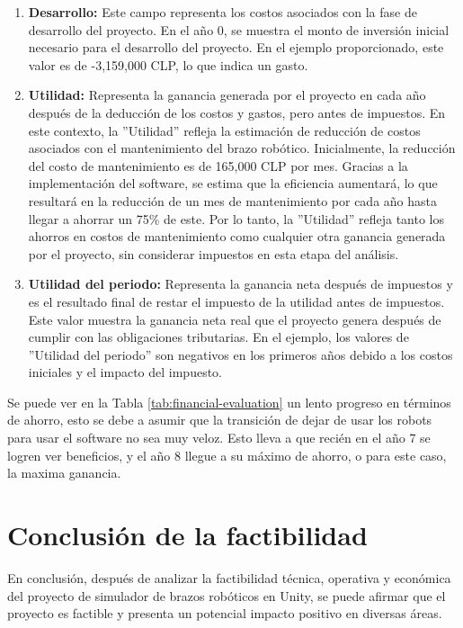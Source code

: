 \begin{enumerate}[label=\arabic*.]
    \item \textbf{Desarrollo:} Este campo representa los costos asociados con la fase de desarrollo del proyecto. En el año 0, se muestra el monto de inversión inicial necesario para el desarrollo del proyecto. En el ejemplo proporcionado, este valor es de -3,159,000 CLP, lo que indica un gasto.
    
    \item \textbf{Utilidad:} Representa la ganancia generada por el proyecto en cada año después de la deducción de los costos y gastos, pero antes de impuestos. En este contexto, la ''Utilidad'' refleja la estimación de reducción de costos asociados con el mantenimiento del brazo robótico. Inicialmente, la reducción del costo de mantenimiento es de 165,000 CLP por mes. Gracias a la implementación del software, se estima que la eficiencia aumentará, lo que resultará en la reducción de un mes de mantenimiento por cada año hasta llegar a ahorrar un 75\% de este. Por lo tanto, la ''Utilidad'' refleja tanto los ahorros en costos de mantenimiento como cualquier otra ganancia generada por el proyecto, sin considerar impuestos en esta etapa del análisis.
    
    \item \textbf{Utilidad del periodo:} Representa la ganancia neta después de impuestos y es el resultado final de restar el impuesto de la utilidad antes de impuestos. Este valor muestra la ganancia neta real que el proyecto genera después de cumplir con las obligaciones tributarias. En el ejemplo, los valores de ''Utilidad del periodo'' son negativos en los primeros años debido a los costos iniciales y el impacto del impuesto.
\end{enumerate}

Se puede ver en la Tabla \ref{tab:financial-evaluation} un lento progreso en términos de ahorro, esto se debe a asumir que la transición de dejar de usar los robots para usar el software no sea muy veloz. Esto lleva a que recién en el año 7 se logren ver beneficios, y el año 8 llegue a su máximo de ahorro, o para este caso, la maxima ganancia.

\clearpage
\section{Conclusión de la factibilidad}

En conclusión, después de analizar la factibilidad técnica, operativa y económica del proyecto de simulador de brazos robóticos en Unity, se puede afirmar que el proyecto es factible y presenta un potencial impacto positivo en diversas áreas.

